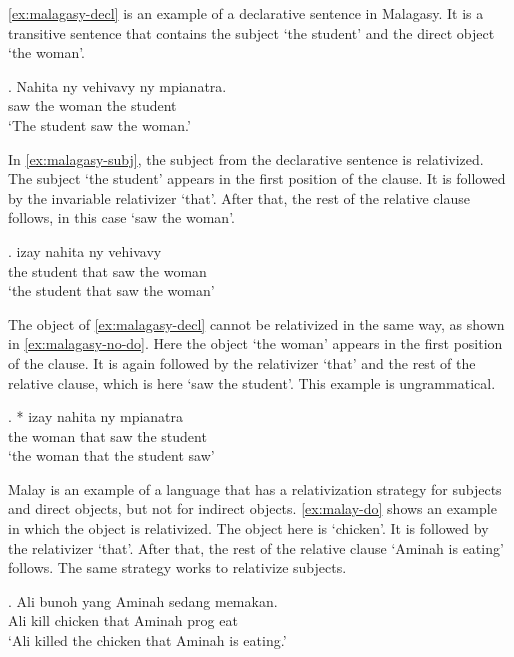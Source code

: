 \ref{ex:malagasy-decl} is an example of a declarative sentence in Malagasy. It is a transitive sentence that contains the subject  `the student' and the direct object  `the woman'.

\exg. Nahita ny vehivavy ny mpianatra.\\
 saw the woman the student\\
 `The student saw the woman.' \label{ex:malagasy-decl}

In \ref{ex:malagasy-subj}, the subject from the declarative sentence is relativized. The subject  `the student' appears in the first position of the clause. It is followed by the invariable relativizer  `that'. After that, the rest of the relative clause follows, in this case  `saw the woman'.

\exg.   izay nahita ny vehivavy\\
 the student that saw the woman\\
 `the student that saw the woman' \label{ex:malagasy-subj}

The object of \ref{ex:malagasy-decl} cannot be relativized in the same way, as shown in \ref{ex:malagasy-no-do}. Here the object  `the woman' appears in the first position of the clause. It is again followed by the relativizer  `that' and the rest of the relative clause, which is here  `saw the student'. This example is ungrammatical.

\exg. *  izay nahita ny mpianatra\\
 the woman that saw the student\\
 `the woman that the student saw' \label{ex:malagasy-no-do}

Malay is an example of a language that has a relativization strategy for subjects and direct objects, but not for indirect objects. \ref{ex:malay-do} shows an example in which the object is relativized. The object here is  `chicken'. It is followed by the relativizer  `that'. After that, the rest of the relative clause  `Aminah is eating' follows. The same strategy works to relativize subjects.

\exg. Ali bunoh  yang Aminah sedang memakan.\\
 Ali kill chicken that Aminah \ac{prog} eat\\
 `Ali killed the chicken that Aminah is eating.' \label{ex:malay-do}

